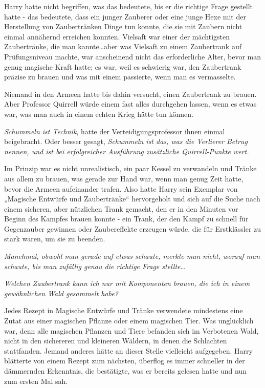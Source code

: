 {Harry hatte nicht begriffen, was das bedeutete, bis er die richtige Frage gestellt hatte - das bedeutete, dass ein junger Zauberer oder eine junge Hexe mit der Herstellung von Zaubertränken Dinge tun konnte, die sie mit Zaubern nicht einmal annähernd erreichen konnten. Vielsaft war einer der mächtigsten Zaubertränke, die man kannte…aber was Vielsaft zu einem Zaubertrank auf Prüfungsniveau machte, war anscheinend nicht das erforderliche Alter, bevor man genug magische Kraft hatte; es war, weil es schwierig war, den Zaubertrank präzise zu brauen und was mit einem passierte, wenn man es vermasselte.

Niemand in den Armeen hatte bis dahin versucht, einen Zaubertrank zu brauen. Aber Professor Quirrell würde einem fast alles durchgehen lassen, wenn es etwas war, was man auch in einem echten Krieg hätte tun können.

\emph{Schummeln ist Technik}, hatte der Verteidigungsprofessor ihnen einmal beigebracht. Oder besser gesagt, \emph{Schummeln ist das, was die Verlierer Betrug nennen, und ist bei erfolgreicher Ausführung zusätzliche Quirrell-Punkte wert.}

Im Prinzip war es nicht unrealistisch, ein paar Kessel zu verwandeln und Tränke aus allem zu brauen, was gerade zur Hand war, wenn man genug Zeit hatte, bevor die Armeen aufeinander trafen. Also hatte Harry sein Exemplar von „Magische Entwürfe und Zaubertränke“ hervorgeholt und sich auf die Suche nach einem sicheren, aber nützlichen Trank gemacht, den er in den Minuten vor Beginn des Kampfes brauen konnte - ein Trank, der den Kampf zu schnell für Gegenzauber gewinnen oder Zaubereffekte erzeugen würde, die für Erstklässler zu stark waren, um sie zu beenden.

\emph{Manchmal, obwohl man gerade auf etwas schaute, merkte man nicht, worauf man schaute, bis man zufällig genau die richtige Frage stellte…}

\emph{Welchen Zaubertrank kann ich nur mit Komponenten brauen, die ich in einem gewöhnlichen Wald gesammelt habe?}

Jedes Rezept in Magische Entwürfe und Tränke verwendete mindestens eine Zutat aus einer magischen Pflanze oder einem magischen Tier. Was unglücklich war, denn alle magischen Pflanzen und Tiere befanden sich im Verbotenen Wald, nicht in den sichereren und kleineren Wäldern, in denen die Schlachten stattfanden. Jemand anderes hätte an dieser Stelle vielleicht aufgegeben. Harry blätterte von einem Rezept zum nächsten, überflog es immer schneller in der dämmernden Erkenntnis, die bestätigte, was er bereits gelesen hatte und nun zum ersten Mal sah.

}
